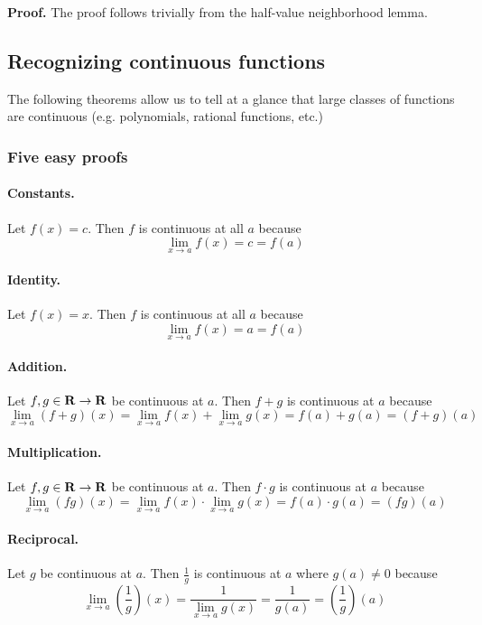 \vs

\textbf{Proof.} The proof follows trivially from the half-value
neighborhood lemma.


\subsection{Recognizing continuous functions}
The following theorems allow us to tell at a glance that large classes
of functions are continuous (e.g. polynomials, rational functions,
etc.)

\subsubsection*{Five easy proofs}

\paragraph{Constants.} Let $f(x)=c$. Then $f$ is continuous at all $a$
because
\[\lim_{x\to a}f(x)=c=f(a)\]

\paragraph{Identity.} Let $f(x)=x$. Then $f$ is continuous at all $a$
because
\[\lim_{x\to a}f(x)=a=f(a)\]

\paragraph{Addition.} Let $f,g\in\mathbf{R}\to\mathbf{R}$ be continuous at $a$. Then
$f+g$ is continuous at $a$ because
\[\lim_{x\to a}(f+g)(x)=\lim_{x\to a}f(x)+\lim_{x\to a}g(x)=f(a)+g(a)=(f+g)(a)\]

\paragraph{Multiplication.} Let $f,g\in\mathbf{R}\to\mathbf{R}$ be continuous at $a$. Then
$f\cdot g$ is continuous at $a$ because
\[\lim_{x\to a}(fg)(x)=\lim_{x\to a}f(x)\cdot\lim_{x\to a}g(x)=f(a)\cdot g(a)=(fg)(a)\]

\paragraph{Reciprocal.} Let $g$ be continuous at $a$. Then $\frac{1}{g}$
is continuous at $a$ where $g(a)\neq 0$ because
\[\lim_{x\to a}\left(\frac{1}{g}\right)(x)=\frac{1}{\lim_{x\to a}g(x)}=\frac{1}{g(a)}=\left(\frac{1}{g}\right)(a)\]

